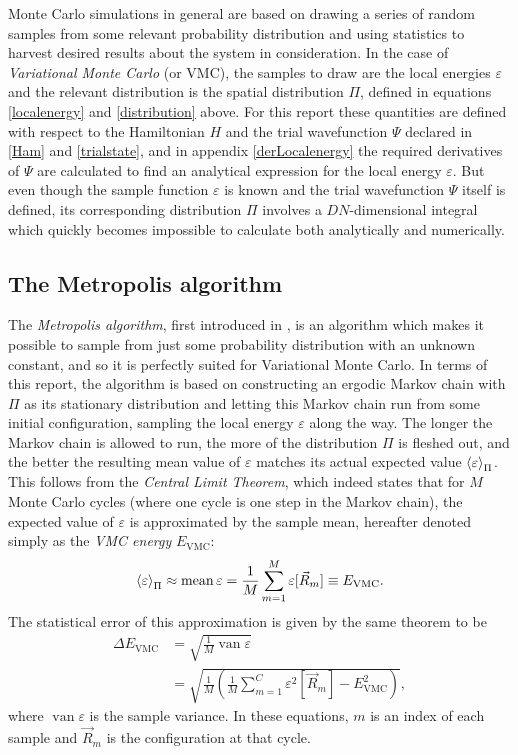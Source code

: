 \documentclass[a4paper,8pt]{article}
\DeclareMathOperator{\mean}{mean}
\DeclareMathOperator{\van}{van}
\begin{document}
\begin{multicols}{2}
Monte Carlo simulations in general are based on drawing a series of random samples from some relevant probability distribution and using statistics to harvest desired results about the system in consideration. In the case of \textit{Variational Monte Carlo} (or VMC), the samples to draw are the local energies $\varepsilon$ and the relevant distribution is the spatial distribution $\Pi$, defined in equations \eqref{localenergy} and \eqref{distribution} above. For this report these quantities are defined with respect to the Hamiltonian $H$ and the trial wavefunction $\Psi$ declared in \eqref{Ham} and \eqref{trialstate}, and in appendix \ref{derLocalenergy} the required derivatives of $\Psi$ are calculated to find an analytical expression for the local energy $\varepsilon$. But even though the sample function $\varepsilon$ is known and the trial wavefunction $\Psi$ itself is defined, its corresponding distribution $\Pi$ involves a $DN$-dimensional integral which quickly becomes impossible to calculate both analytically and numerically.


\subsection{The Metropolis algorithm}\label{Metropolis}
The \textit{Metropolis algorithm}, first introduced in \cite{MRRTT}, is an algorithm which makes it possible to sample from just some probability distribution with an unknown constant, and so it is perfectly suited for Variational Monte Carlo. In terms of this report, the algorithm is based on constructing an ergodic Markov chain with $\Pi$ as its stationary distribution and letting this Markov chain run from some initial configuration, sampling the local energy $\varepsilon$ along the way. The longer the Markov chain is allowed to run, the more of the distribution $\Pi$ is fleshed out, and the better the resulting mean value of $\varepsilon$ matches its actual expected value $\ev{\varepsilon}_\Pi$. This follows from the \textit{Central Limit Theorem}, which indeed states that for $M$ Monte Carlo cycles (where one cycle is one step in the Markov chain), the expected value of $\varepsilon$ is approximated by the sample mean, hereafter denoted simply as the \textit{VMC energy} $E_\text{VMC}$:
\begin{equation}\label{estimate}
\ev{\varepsilon}_\Pi \approx \mean\varepsilon = \frac{1}{M}\sum\limits_{m = 1}^M \varepsilon[\vec{R}_m] \equiv E_\text{VMC}.
\end{equation}
The statistical error of this approximation is given by the same theorem to be
\begin{align}
\Delta E_\text{VMC} &= \sqrt{\frac{1}{M} \van\varepsilon} \nonumber\\
&= \sqrt{\frac{1}{M}\left(\frac{1}{M}\sum\limits_{m = 1}^C \varepsilon^2[\vec{R}_m] - E^2_\text{VMC}\right)}, \label{error}
\end{align}
where $\van\varepsilon$ is the sample variance. In these equations, $m$ is an index of each sample and $\vec{R}_m$ is the configuration at that cycle.


\end{multicols}
\end{document}
